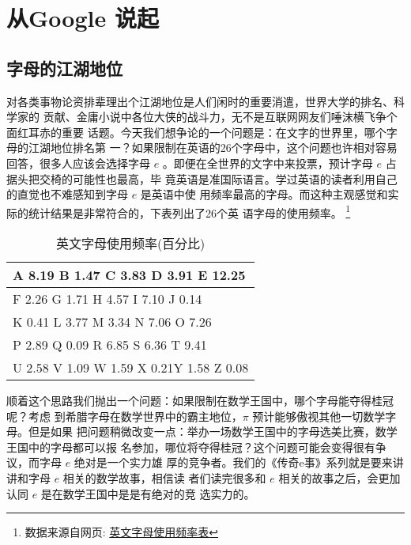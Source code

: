 %

\chapter{从Google 说起}

\section{字母的江湖地位}
对各类事物论资排辈理出个江湖地位是人们闲时的重要消遣，世界大学的排名、科学家的
贡献、金庸小说中各位大侠的战斗力，无不是互联网网友们唾沫横飞争个面红耳赤的重要
话题。今天我们想争论的一个问题是：在文字的世界里，哪个字母的江湖地位排名第
一？如果限制在英语的26个字母中，这个问题也许相对容易回答，很多人应该会选择字母
 $e$ 。即便在全世界的文字中来投票，预计字母 $e$ 占据头把交椅的可能性也最高，毕
竟英语是准国际语言。学过英语的读者利用自己的直觉也不难感知到字母 $e$ 是英语中使
用频率最高的字母。而这种主观感觉和实际的统计结果是非常符合的，下表列出了26个英
语字母的使用频率。
\footnote{
数据来源自网页: \href{http://www.zybang.com/question/26516e9f9dc704c301ad064f21265855.html}{英文字母使用频率表}
}

\begin{table}[htbp]
\centering
\caption{英文字母使用频率(百分比)}
\begin{tabular}{|l|}
\hline
A 8.19 B 1.47 C 3.83 D 3.91 E 12.25      \\ \hline
F 2.26 G 1.71 H 4.57 I 7.10 J 0.14       \\ \hline
K 0.41 L 3.77 M 3.34 N 7.06 O 7.26       \\ \hline
P 2.89 Q 0.09 R 6.85 S 6.36 T 9.41       \\ \hline
U 2.58 V 1.09 W 1.59 X 0.21Y 1.58 Z 0.08 \\ \hline
\end{tabular}
\centering
\end{table}

顺着这个思路我们抛出一个问题：如果限制在数学王国中，哪个字母能夺得桂冠呢？考虑
到希腊字母在数学世界中的霸主地位，$\pi$ 预计能够傲视其他一切数学字母。但是如果
把问题稍微改变一点：举办一场数学王国中的字母选美比赛，数学王国中的字母都可以报
名参加，哪位将夺得桂冠？这个问题可能会变得很有争议，而字母 $e$ 绝对是一个实力雄
厚的竞争者。我们的《传奇e事》系列就是要来讲讲和字母 $e$ 相关的数学故事，相信读
者们读完很多和 $e$ 相关的故事之后，会更加认同 $e$ 是在数学王国中是是有绝对的竞
选实力的。

